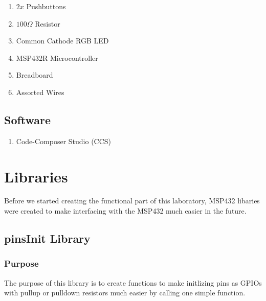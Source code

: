 \documentclass[11pt,a4paper]{article}
\begin{document}
\begin{enumerate}
  \item \(2x\) Pushbuttons
  \item \(100\Omega\) Resistor
  \item Common Cathode RGB LED
  \item MSP432R Microcontroller
  \item Breadboard
  \item Assorted Wires
\end{enumerate}

\subsection{Software}

\begin{enumerate}
  \item Code-Composer Studio (CCS)
\end{enumerate}
\newpage
\section{Libraries}
\label{section::lib}
Before we started creating the functional part of this laboratory, MSP432 libaries were created to make 
interfacing with the MSP432 much easier in the future.
\subsection{pinsInit Library}
\subsubsection{Purpose}
The purpose of this library is to create functions to make initlizing pins as GPIOs with pullup or pulldown
resistors much easier by calling one simple function.
\end{document}
